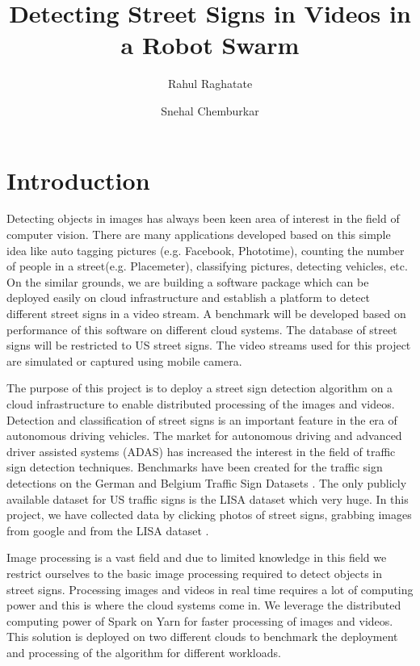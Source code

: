 \documentclass[9pt,twocolumn,twoside]{../../styles/osajnl}
\title{Detecting Street Signs in Videos in a Robot Swarm}
\author[1,*]{Rahul Raghatate}
\author[1]{Snehal Chemburkar}
\affil[1]{School of Informatics and Computing, Bloomington, IN 47408,
  U.S.A.}
\affil[*]{Corresponding authors: rraghata@iu.edu, snehchem@iu.edu}
\begin{document}
\maketitle

\section{Introduction}
Detecting objects in images has always been keen area of interest in
the field of computer vision. There are many applications developed
based on this simple idea like auto tagging pictures (e.g. Facebook,
Phototime), counting the number of people in a
street(e.g. Placemeter), classifying pictures, detecting vehicles,
etc. On the similar grounds, we are building a software package which
can be deployed easily on cloud infrastructure and establish a
platform to detect different street signs in a video stream. A
benchmark will be developed based on performance of this software on
different cloud systems. The database of street signs will be
restricted to US street signs. The video streams used for this project
are simulated or captured using mobile camera.

The purpose of this project is to deploy a street sign detection algorithm on a cloud infrastructure to enable distributed processing of the images and videos. Detection and classification of street signs is an important feature in the era of autonomous driving vehicles. The market for autonomous driving and advanced driver assisted systems (ADAS) has increased the interest in the field of traffic sign detection techniques. Benchmarks have been created for the traffic sign detections on the German and Belgium Traffic Sign Datasets \cite{paper-trafficsign}. The only publicly available dataset for US traffic signs is the LISA dataset \cite{paper-lisadataset} which very huge. In this project, we have collected data by clicking photos of street signs, grabbing images from google and from the LISA dataset \cite{paper-lisadataset}. 

Image processing is a vast field and due to limited knowledge in this field we restrict ourselves to the basic image processing required to detect objects in street signs. Processing images and videos in real time requires a lot of computing power and this is where the cloud systems come in. We leverage the distributed computing power of Spark on Yarn for faster processing of images and videos. This solution is deployed on two different clouds to benchmark the deployment and processing of the algorithm for different workloads.
\end{document}
